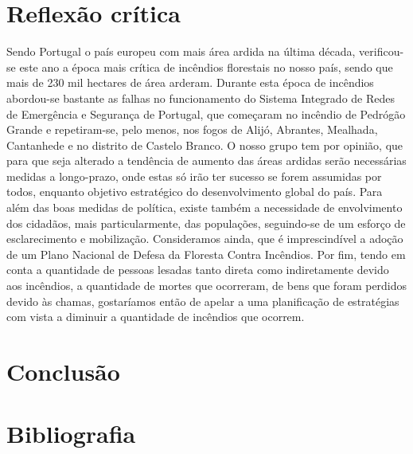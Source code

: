 \documentclass[a4paper,11pt]{report}
\begin{document}
\part{Reflexão crítica}
Sendo Portugal o país europeu com mais área ardida na última década, verificou-se este ano a época mais crítica de incêndios florestais no nosso país, sendo que mais de 230 mil hectares de área arderam.
Durante esta época de incêndios abordou-se bastante as falhas no funcionamento do Sistema Integrado de Redes de Emergência e Segurança de Portugal, que começaram no incêndio de Pedrógão Grande e repetiram-se, pelo menos, nos fogos de Alijó, Abrantes, Mealhada, Cantanhede e no distrito de Castelo Branco.
O nosso grupo tem por opinião, que para que seja alterado a tendência de aumento das áreas ardidas serão necessárias medidas a longo-prazo, onde estas só irão ter sucesso se forem assumidas por todos, enquanto objetivo estratégico do desenvolvimento global do país.
Para além das boas medidas de política, existe também a necessidade de envolvimento dos cidadãos, mais particularmente, das populações, seguindo-se de um esforço de esclarecimento e mobilização.
Consideramos ainda, que é imprescindível a adoção de um Plano Nacional de Defesa da Floresta Contra Incêndios.
Por fim, tendo em conta a quantidade de pessoas lesadas tanto direta como indiretamente devido aos incêndios, a quantidade de mortes que ocorreram, de bens que foram perdidos devido às chamas, gostaríamos então de apelar a uma planificação de estratégias com vista a diminuir a quantidade de incêndios que ocorrem. 





\part{Conclusão}






\part{Bibliografia}


\printbibliography
\end{document}

